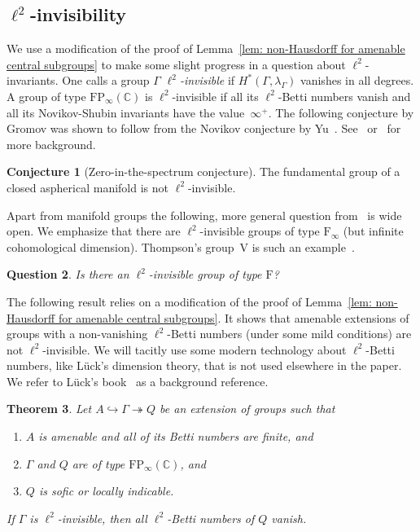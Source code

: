 \documentclass[12pt,reqno]{amsart}
\newcommand{\C}{\mathbb{C}}
\newtheorem{theorem}{Theorem}[section]
\newtheorem{question}[theorem]{Question}
\theoremstyle{definition}
\newtheorem{conjecture}[theorem]{Conjecture}
\begin{document}
\subsection{$\ell^2$-invisibility}We use a modification of the proof of Lemma~\ref{lem: non-Hausdorff for amenable central subgroups} to make some slight progress in a question about $\ell^2$-invariants. 
One calls a group $\Gamma$ \emph{$\ell^2$-invisible} if $H^\ast(\Gamma, \lambda_\Gamma)$ vanishes in all degrees. A group of type $\mathrm{FP}_\infty(\C)$ is $\ell^2$-invisible if all its $\ell^2$-Betti numbers vanish and all its Novikov-Shubin invariants have the value~$\infty^+$. The following conjecture by Gromov was shown to follow from the Novikov conjecture by Yu~\cite{Yu}. See~\cite{Lott} or~\cite[Chapter~12]{LuckBook} for more background. 

\begin{conjecture}[Zero-in-the-spectrum conjecture]
    The fundamental group of a closed aspherical manifold is not $\ell^2$-invisible.
\end{conjecture}

Apart from manifold groups the following, more general question from~\cite{SauerThumann} is wide open. 
We emphasize that there are $\ell^2$-invisible groups of type $\mathrm{F}_\infty$ (but infinite cohomological dimension). Thompson's group~V is such an example~\cite{SauerThumann}. 

\begin{question}
    Is there an $\ell^2$-invisible group of type $\mathrm{F}$? 
\end{question}

The following result relies on a modification of the proof of Lemma~\ref{lem: non-Hausdorff for amenable central subgroups}. It shows that amenable extensions of groups with a non-vanishing $\ell^2$-Betti numbers (under some mild conditions) are not $\ell^2$-invisible. We will tacitly use some modern technology about $\ell^2$-Betti numbers, like L\"uck's dimension theory, that is not used elsewhere in the paper. 
We refer to L\"uck's book~\cite{LuckBook} as a background reference. 

\begin{theorem}\label{thm: non-Hausdorff for amenable normal subgroups}
Let $A\hookrightarrow \Gamma\twoheadrightarrow Q$ be an extension of groups such that 
\begin{enumerate}
\item $A$ is amenable and all of its Betti numbers are finite, and 
\item $\Gamma$ and $Q$ are of type $\mathrm{FP}_\infty(\C)$, and 
\item $Q$ is sofic or locally indicable. 
\end{enumerate}
If $\Gamma$ is $\ell^2$-invisible, then all $\ell^2$-Betti numbers of $Q$ vanish. 
\end{theorem}
\end{document}
